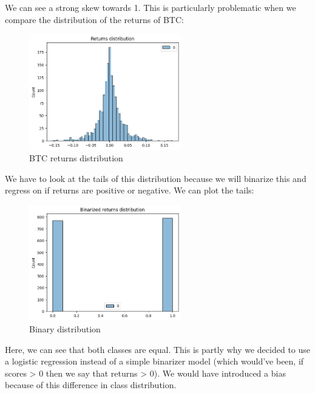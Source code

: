 \documentclass[
  a4paper]{article}
\begin{document}
We can see a strong skew towards 1. This is particularly problematic
when we compare the distribution of the returns of BTC:\\

\begin{figure}

{\centering \includegraphics[width=2.60417in,height=\textheight]{graphs/Returns distribution.png}

}

\caption{BTC returns distribution}

\end{figure}

We have to look at the tails of this distribution because we will
binarize this and regress on if returns are positive or negative. We can
plot the tails:

\begin{figure}

{\centering \includegraphics[width=2.60417in,height=\textheight]{graphs/binary_distrib.png}

}

\caption{Binary distribution}

\end{figure}

Here, we can see that both classes are equal. This is partly why we
decided to use a logistic regression instead of a simple binarizer model
(which would've been, if scores \textgreater{} 0 then we say that
returns \textgreater{} 0). We would have introduced a bias because of
this difference in class distribution.
\end{document}

